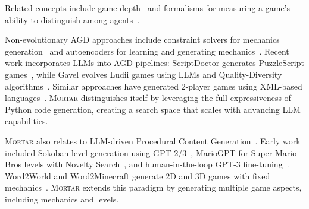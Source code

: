 \documentclass{article} %
\newcommand{\name}{\textsc{Mortar}}
\begin{document}
Related concepts include game depth~\citep{lantz2017depth} and formalisms for measuring a game's ability to distinguish among agents~\citep{stephenson2020continuous}.

Non-evolutionary AGD approaches include constraint solvers for mechanics generation~\citep{zook2014automatic} and autoencoders for learning and generating mechanics~\citep{rieder2018using}. Recent work incorporates LLMs into AGD pipelines: ScriptDoctor generates PuzzleScript games~\citep{earle2025scriptdoctor}, while Gavel evolves Ludii games using LLMs and Quality-Diversity algorithms~\citep{todd2024gavel}. Similar approaches have generated 2-player games using XML-based languages~\citep{jorge2023automated}. \name{} distinguishes itself by leveraging the full expressiveness of Python code generation, creating a search space that scales with advancing LLM capabilities.







\name{} also relates to LLM-driven Procedural Content Generation~\citep{togelius2011search, shaker2016procedural, liu2021deep}. Early work included Sokoban level generation using GPT-2/3~\citep{todd2023level}, MarioGPT for Super Mario Bros levels with Novelty Search~\citep{sudhakaran2023mariogpt}, and human-in-the-loop GPT-3 fine-tuning~\citep{nasir2023practical}. Word2World and Word2Minecraft generate 2D and 3D games with fixed mechanics~\citep{nasir2024word2world, huang2025word2minecraft}. \name{} extends this paradigm by generating multiple game aspects, including mechanics and levels.
\end{document}
